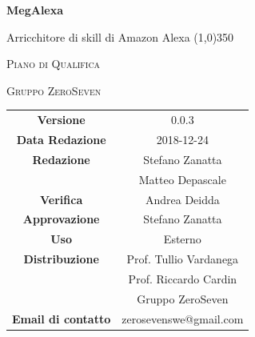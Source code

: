 \documentclass[a4paper,12pt]{book}
\author{Stefano Zanatta}
\date{2018-12-24}
\begin{document}
\begin{titlepage}
	\centering
	{\huge\bfseries MegAlexa\par}
	Arricchitore di skill di Amazon Alexa
	\line(1,0){350} \\
	{\scshape\LARGE Piano di Qualifica \par}
	\vspace{1cm}
	{\scshape Gruppo ZeroSeven \par}
	\logo
	\begin{tabular}{c|c}
		{\hfill \textbf{Versione}} 			& 0.0.3				\\
		{\hfill\textbf{Data Redazione}} 	& 2018-12-24		\\ 
		{\hfill\textbf{Redazione}} 			&  		Stefano Zanatta			\\& Matteo Depascale\\
		{\hfill\textbf{Verifica}} 				&  	Andrea Deidda			\\ 
		{\hfill\textbf{Approvazione}} 		&  		Stefano Zanatta			\\ 
		{\hfill\textbf{Uso}} 					& 		Esterno		\\ 
		{\hfill\textbf{Distribuzione}} 			& 			Prof. Tullio Vardanega \\ & Prof. Riccardo Cardin \\ & Gruppo ZeroSeven		\\ 
		{\hfill\textbf{Email di contatto}} & zerosevenswe@gmail.com \\
	\end{tabular}
\end{titlepage}
	

	
	\label{LastFrontPage}
	\newpage	
	
	\pagestyle{mymain}
	\tableofcontents
	
	
	
	\begin{appendices}
		
	\end{appendices}

			
	\label{LastPage}
\end{document}
